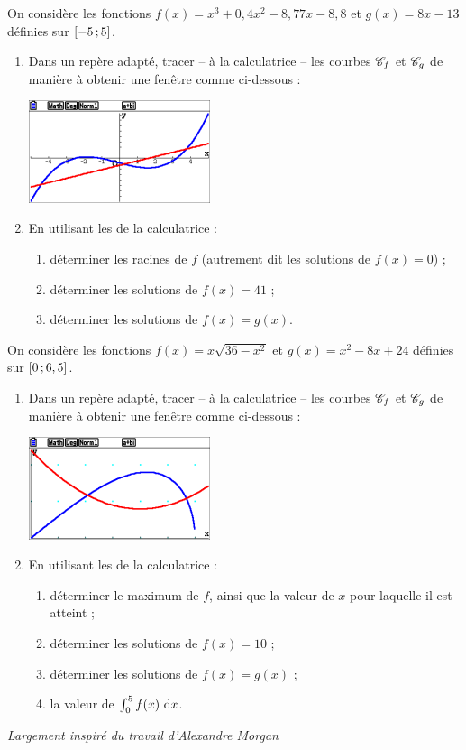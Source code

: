 \documentclass[a4paper,11pt]{article}
\begin{document}
\begin{cexercice}
On considère les fonctions $f(x)=x^3+0,4x^2-8,77x-8,8$ et $g(x)=8x-13$ définies sur $\mbox{\ensuremath{\left[-5\mathpunct{};5\right]}}$.
%
\begin{enumerate}
	\item Dans un repère adapté, tracer -- à la calculatrice -- les courbes $\mathscr{C}_{f}$ et $\mathscr{C}_{g}$ de manière à obtenir une fenêtre comme ci-dessous :
	\begin{center}
		\includegraphics[height=3cm]{tp01_calco_a}
	\end{center}
	\item En utilisant les  de la calculatrice :
	\begin{enumerate}
		\item déterminer les racines de $f$ (autrement dit les solutions de $f(x)=0$) ;
		\item déterminer les solutions de $f(x)=41$ ;
		\item déterminer les solutions de $f(x)=g(x)$.
	\end{enumerate}
\end{enumerate}
\end{cexercice}

\begin{cexercice}
On considère les fonctions $f(x)=x\sqrt{36-x^2}$ et $g(x)=x^2-8x+24$ définies sur $\mbox{\ensuremath{\left[0\mathpunct{};6,5\right]}}$.
%
\begin{enumerate}
	\item Dans un repère adapté, tracer -- à la calculatrice -- les courbes $\mathscr{C}_{f}$ et $\mathscr{C}_{g}$ de manière à obtenir une fenêtre comme ci-dessous :
	\begin{center}
		\includegraphics[height=3cm]{tp01_calco_b}
	\end{center}
	\item En utilisant les  de la calculatrice :
	\begin{enumerate}
		\item déterminer le maximum de $f$, ainsi que la valeur de $x$ pour laquelle il est atteint ;
		\item déterminer les solutions de $f(x)=10$ ;
		\item déterminer les solutions de $f(x)=g(x)$ ;
		\item la valeur de $\int_0^5 f(x) ~\text{d}x$.
	\end{enumerate}
\end{enumerate}
\end{cexercice}

\vfill{}

\hfill{}{\footnotesize \blue \itshape Largement inspiré du travail d'Alexandre Morgan}
\end{document}
